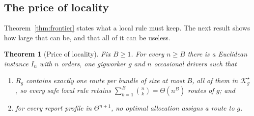 \documentclass[review,12pt]{elsarticle}
\newtheorem{theorem}{Theorem}
\theoremstyle{definition}
\theoremstyle{remark}
\newcommand{\Kstar}{\mathcal{K}^\star}
\begin{document}
\subsection{The price of locality}

Theorem~\ref{thm:frontier} states what a local rule must keep. The next
result shows how large that can be, and that all of it can be useless.

\begin{theorem}[Price of locality]
\label{thm:pol}
Fix $B\ge 1$. For every $n\ge B$ there is a Euclidean instance $I_n$ with
$n$ orders, one gigworker $g$ and $n$ occasional drivers such that
\begin{enumerate}
\item[(i)] $R_g$ contains exactly one route per bundle of size at most $B$,
all of them in $\Kstar_g$, so every safe local rule retains
$\sum_{k=1}^B\binom nk=\Theta(n^B)$ routes of $g$; and
\item[(ii)] for every report profile in $\Theta^{n+1}$, no optimal
allocation assigns a route to $g$.
\end{enumerate}
\end{theorem}
\end{document}
